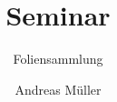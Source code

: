 %
%
%

\beamertemplatenavigationsymbolsempty
\title[Seminar]{Seminar}
\subtitle{Foliensammlung}
\author[A.~Müller]{Andreas Müller}
\date[]{}

\def\folie#1{
\begin{frame}
\begin{center}
\tt #1
\end{center}
\end{frame}

}
